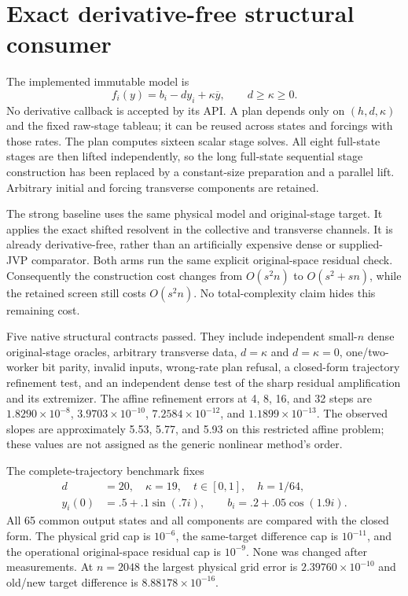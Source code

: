 \documentclass[aps,pra,reprint,onecolumn,12pt,notitlepage,superscriptaddress,nofootinbib]{revtex4-2}
\begin{document}
\section{Exact derivative-free structural consumer}
The implemented immutable model is
\begin{equation}
 f_i(y)=b_i-dy_i+\kappa\overline y,\qquad d\ge\kappa\ge0.
\end{equation}
No derivative callback is accepted by its API. A plan depends only on
$(h,d,\kappa)$ and the fixed raw-stage tableau; it can be reused across
states and forcings with those rates. The plan computes sixteen scalar
stage solves. All eight full-state stages are then lifted independently,
so the long full-state sequential stage construction has been replaced
by a constant-size preparation and a parallel lift. Arbitrary initial
and forcing transverse components are retained.

The strong baseline uses the same physical model and original-stage target.
It applies the exact shifted resolvent in the collective and transverse channels.
It is already derivative-free, rather than an artificially expensive
dense or supplied-JVP comparator. Both arms run the same explicit
original-space residual check. Consequently the construction cost changes
from $O(s^2n)$ to $O(s^2+sn)$, while the retained screen still costs
$O(s^2n)$. No total-complexity claim hides this remaining cost.

Five native structural contracts passed. They include independent
small-$n$ dense original-stage oracles, arbitrary transverse data,
$d=\kappa$ and $d=\kappa=0$, one/two-worker bit parity, invalid inputs,
wrong-rate plan refusal, a closed-form trajectory refinement test, and an
independent dense test of the sharp residual amplification and its extremizer.
The affine refinement errors at 4, 8, 16, and 32 steps are
$1.8290\times10^{-8}$, $3.9703\times10^{-10}$,
$7.2584\times10^{-12}$, and $1.1899\times10^{-13}$.
The observed slopes are approximately 5.53, 5.77, and 5.93 on this
restricted affine problem; these values are not assigned as the generic
nonlinear method's order.

The complete-trajectory benchmark fixes
\begin{align}
 d&=20,\quad\kappa=19,\quad t\in[0,1],\quad h=1/64,\\
 y_i(0)&=.5+.1\sin(.7i),\qquad
 b_i=.2+.05\cos(1.9i).
\end{align}
All 65 common output states and all components are compared with the
closed form. The physical grid cap is $10^{-6}$, the same-target difference
cap is $10^{-11}$, and the operational original-space residual cap is
$10^{-9}$. None was changed after measurements. At $n=2048$ the largest
physical grid error is $2.39760\times10^{-10}$ and old/new target difference
is $8.88178\times10^{-16}$.
\end{document}
